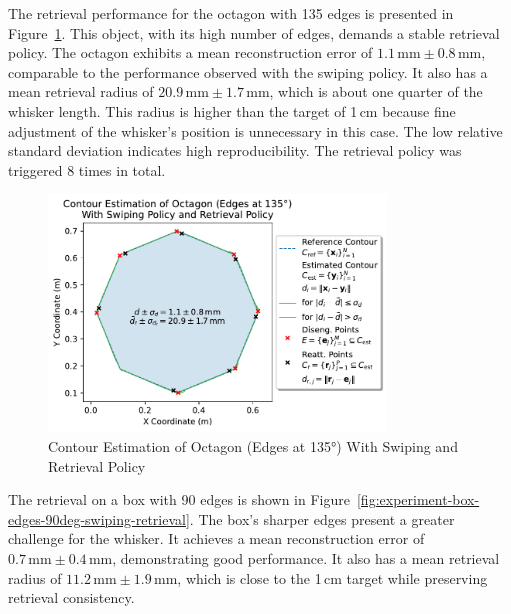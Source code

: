 The retrieval performance for the octagon with 135\degree{} edges is presented in Figure~\ref{fig:experiment-octagon-edges-135deg-swiping-retrieval}.
This object, with its high number of edges, demands a stable retrieval policy.
The octagon exhibits a mean reconstruction error of $1.1\,\text{mm} \pm 0.8\,\text{mm}$, comparable to the performance observed with the swiping policy.
It also has a mean retrieval radius of $20.9\,\text{mm} \pm 1.7\,\text{mm}$, which is about one quarter of the whisker length.
This radius is higher than the target of 1\,cm because fine adjustment of the whisker's position is unnecessary in this case.
The low relative standard deviation indicates high reproducibility.
The retrieval policy was triggered 8 times in total.

\begin{figure}[!htb]
    \centering
    \includegraphics[width=0.8\textwidth]{figures/experiments/octagon-edges-135deg-swiping-retrieval}
    \caption{Contour Estimation of Octagon (Edges at 135°) With Swiping and Retrieval Policy}
    \label{fig:experiment-octagon-edges-135deg-swiping-retrieval}
\end{figure}

The retrieval on a box with 90\degree{} edges is shown in Figure~\ref{fig:experiment-box-edges-90deg-swiping-retrieval}.
The box’s sharper edges present a greater challenge for the whisker.
It achieves a mean reconstruction error of $0.7\,\text{mm} \pm 0.4\,\text{mm}$, demonstrating good performance.
It also has a mean retrieval radius of $11.2\,\text{mm} \pm 1.9\,\text{mm}$, which is close to the 1\,cm target while preserving retrieval consistency.

